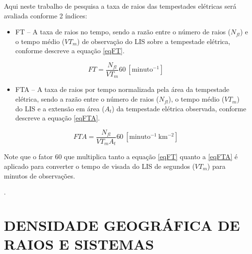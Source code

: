 Aqui neste trabalho de pesquisa a taxa de raios das tempestades elétricas será avaliada conforme 2 índices:

\begin{itemize}
\item FT -- A taxa de raios no tempo, sendo a razão entre o número de raios ($N_{fl}$) e o tempo médio ($VT_m$) de observação do LIS sobre a tempestade elétrica, conforme descreve a equação \ref{eqFT}.
\end{itemize}

\begin{equation}
FT = \frac{N_{fl} }{VT_m} 60 ~[\mathrm{minuto^{-1}}]  
\label{eqFT}  
\end{equation}

\begin{itemize}
\item FTA -- A taxa de raios por tempo normalizada pela área da tempestade elétrica, sendo a razão entre o número de raios ($N_{fl}$), o tempo médio ($VT_m$) do LIS e a extensão em área ($A_t$) da tempestade elétrica observada, conforme descreve a equação \ref{eqFTA}.
\end{itemize}

\begin{equation}
FTA = \frac{N_{fl} }{VT_m A_t } 60 ~[\mathrm{minuto^{-1}~km^{-2}}]
\label{eqFTA}
\end{equation}



Note que o fator 60 que multiplica tanto a equação \ref{eqFT} quanto a \ref{eqFTA} é aplicado para converter o tempo de visada do LIS de segundos ($VT_m$) para minutos de observações.


 .


\section{DENSIDADE GEOGRÁFICA DE RAIOS E SISTEMAS}
\label{metodoPass}


